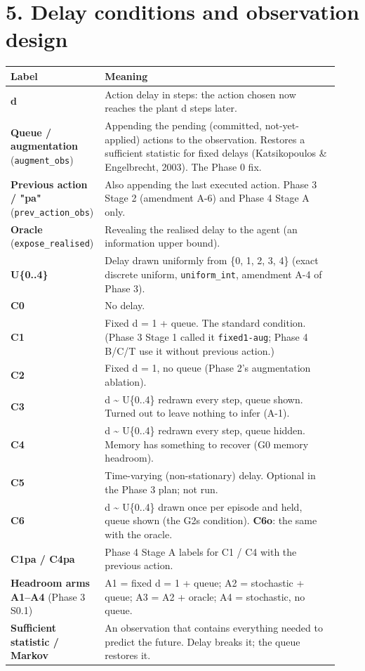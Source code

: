 \documentclass[11pt]{article}
\begin{document}
\section*{5. Delay conditions and observation design}



\begin{center}\small\begin{tabular}{>{\raggedright\arraybackslash}p{0.231\linewidth}>{\raggedright\arraybackslash}p{0.703\linewidth}}
\toprule
Label & Meaning \\
\midrule
\textbf{d} & Action delay in steps: the action chosen now reaches the plant d steps later. \\
\textbf{Queue / augmentation} (\texttt{augment\_obs}) & Appending the pending (committed, not-yet-applied) actions to the observation. Restores a sufficient statistic for fixed delays (Katsikopoulos \& Engelbrecht, 2003). The Phase 0 fix. \\
\textbf{Previous action / "pa"} (\texttt{prev\_\allowbreak{}action\_\allowbreak{}obs}) & Also appending the last executed action. Phase 3 Stage 2 (amendment A-6) and Phase 4 Stage A only. \\
\textbf{Oracle} (\texttt{expose\_\allowbreak{}realised}) & Revealing the realised delay to the agent (an information upper bound). \\
\textbf{U\{0..4\}} & Delay drawn uniformly from \{0, 1, 2, 3, 4\} (exact discrete uniform, \texttt{uniform\_int}, amendment A-4 of Phase 3). \\
\textbf{C0} & No delay. \\
\textbf{C1} & Fixed d = 1 + queue. The standard condition. (Phase 3 Stage 1 called it \texttt{fixed1-aug}; Phase 4 B/C/T use it without previous action.) \\
\textbf{C2} & Fixed d = 1, no queue (Phase 2's augmentation ablation). \\
\textbf{C3} & d \textasciitilde{} U\{0..4\} redrawn every step, queue shown. Turned out to leave nothing to infer (A-1). \\
\textbf{C4} & d \textasciitilde{} U\{0..4\} redrawn every step, queue hidden. Memory has something to recover (G0 memory headroom). \\
\textbf{C5} & Time-varying (non-stationary) delay. Optional in the Phase 3 plan; not run. \\
\textbf{C6} & d \textasciitilde{} U\{0..4\} drawn once per episode and held, queue shown (the G2s condition). \textbf{C6o}: the same with the oracle. \\
\textbf{C1pa / C4pa} & Phase 4 Stage A labels for C1 / C4 with the previous action. \\
\textbf{Headroom arms A1--A4} (Phase 3 S0.1) & A1 = fixed d = 1 + queue; A2 = stochastic + queue; A3 = A2 + oracle; A4 = stochastic, no queue. \\
\textbf{Sufficient statistic / Markov} & An observation that contains everything needed to predict the future. Delay breaks it; the queue restores it. \\
\bottomrule
\end{tabular}\end{center}
\end{document}
